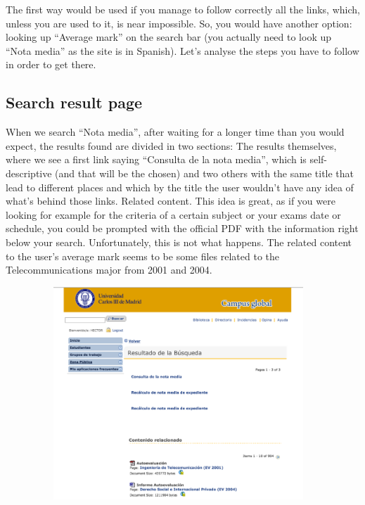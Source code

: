 \documentclass{article}
\begin{document}
The first way would be used if you manage to follow correctly all the links, which, unless you are used to it, is near impossible. So, you would have another option: looking up “Average mark” on the search bar (you actually need to look up “Nota media” as the site is in Spanish). Let’s analyse the steps you have to follow in order to get there.

\newpage

\subsection{Search result page}

When we search “Nota media”, after waiting for a longer time than you would expect, the results found are divided in two sections: 
The results themselves, where we see a first link saying “Consulta de la nota media”, which is self-descriptive (and that will be the chosen) and two others with the same title that lead to different places and which by the title the user wouldn’t have any idea of what’s behind those links. 
Related content. This idea is great, as if you were looking for example for the criteria of a certain subject or your exams date or schedule, you could be prompted with the official PDF with the information right below your search. Unfortunately, this is not what happens. The related content to the user’s average mark seems to be some files related to the Telecommunications major from 2001 and 2004. 
\begin{center}
\includegraphics[width=13cm, height=8cm, keepaspectratio]{busqueda}\vspace{0.3cm} \\
\end{center}
\end{document}
